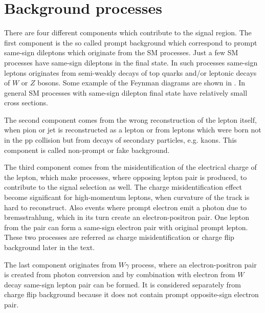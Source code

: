 \section{Background processes}
\label{sec:wprimeBackgrounds}


There are four different components which contribute to the signal region.
The first component is the so called prompt background which correspond to prompt same-sign dileptons which originate from the SM processes.
Just a few SM processes have same-sign dileptons in the final state. In such processes same-sign leptons originates from semi-weakly decays of top quarks
and/or leptonic decays of $W$ or $Z$ bosons. Some example of the Feynman diagrams are shown in .
In general SM processes with same-sign dilepton final state have relatively small cross sections.

The second component comes from the wrong reconstruction of the lepton itself, when pion or jet is reconstructed as a lepton or from leptons which were born 
not in the pp collision but from decays of secondary particles, e.g. kaons. This component is called non-prompt or fake background.

The third component comes from the misidentification of the electrical charge of the lepton, which make processes, where opposing lepton pair is produced, 
to contribute to the signal selection as well. The charge misidentification effect become significant for high-momentum leptons, when curvature of the track 
is hard to reconstruct. Also events where prompt electron emit a photon due to bremsstrahlung, which in its turn create an electron-positron pair.
One lepton from the pair can form a same-sign electron pair with original prompt lepton. These two processes are referred as charge misidentification or
charge flip background later in the text.

The last component originates from $W\gamma$ process, where an electron-positron pair is created from photon conversion and by combination with electron from $W$ decay
same-sign lepton pair can be formed. It is considered separately from charge flip background because it does not contain prompt opposite-sign electron pair.


